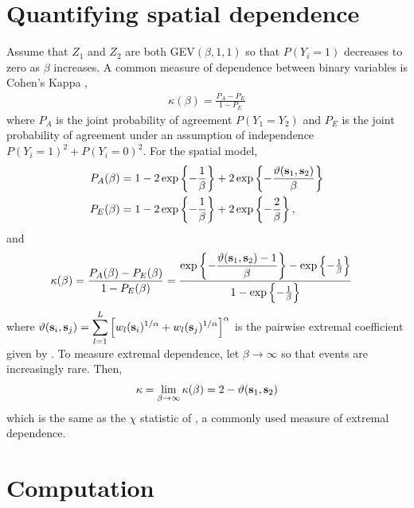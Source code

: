 \documentclass[11pt]{article}
\begin{document}
\section{Quantifying spatial dependence} \label{rbs:spatdep}

Assume that $Z_1$ and $Z_2$ are both GEV$(\beta, 1, 1)$ so that $P(Y_i = 1)$ decreases to zero as $\beta$ increases.
A common measure of dependence between binary variables is Cohen's Kappa \citep{Cohen1960},
\begin{align}
  \kappa(\beta) = \frac{P_A - P_E}{1 - P_E}
\end{align}
where $P_A$ is the joint probability of agreement $P(Y_1 = Y_2)$ and $P_E$ is the joint probability of agreement under an assumption of independence $P(Y_i = 1)^2 + P(Y_i = 0)^2$.
For the spatial model,
\begin{align*}
  P_A(\beta) &= 1 - 2 \exp\left\{ -\frac{1}{\beta} \right\} + 2 \exp\left\{-\frac{\vartheta(\mbox{\bf s}_1, \mbox{\bf s}_2)}{\beta}  \right\} \nonumber \\
  P_E(\beta) &= 1 - 2 \exp \left\{ -\frac{1}{\beta} \right\} + 2 \exp \left\{ -\frac{2}{\beta} \right\}, \nonumber
\end{align*}
and
\begin{align} \label{rbeq:kappa}
  \kappa(\beta) &= \frac{P_A(\beta) - P_E(\beta)}{1 - P_E(\beta)} = \frac{\exp\left\{-\displaystyle\frac{\vartheta(\mbox{\bf s}_1, \mbox{\bf s}_2) - 1}{\beta}  \right\} - \exp \left\{ -\frac{1}{\beta} \right\}}{1 - \exp \left\{ -\frac{1}{\beta} \right\}}
\end{align}
where $\vartheta (\mbox{\bf s}_i, \mbox{\bf s}_j) = \displaystyle \sum_{ l = 1 }^{ L } \left[ w_{l}(\mbox{\bf s}_i)^{ 1/\alpha } +  w_{ l}(\mbox{\bf s}_j)^{ 1/\alpha } \right]^\alpha$ is the pairwise extremal coefficient given by \citet{Reich2012}.
To measure extremal dependence, let $\beta \rightarrow \infty$ so that events are increasingly rare.
Then,
\begin{align}
  \kappa = \lim_{\beta \rightarrow \infty} \kappa(\beta) = 2 - \vartheta(\mbox{\bf s}_1, \mbox{\bf s}_2)
\end{align}
which is the same as the $\chi$ statistic of \citet{Coles2001}, a commonly used measure of extremal dependence.

\section{Computation}\label{rbs:comp}
\end{document}
